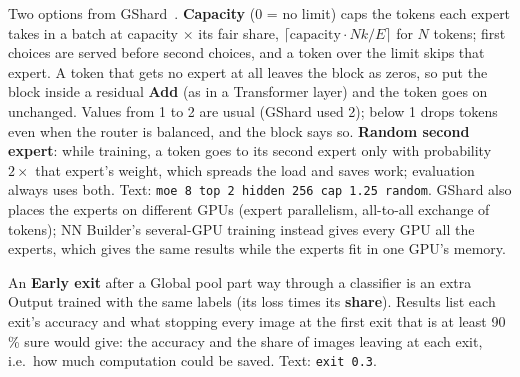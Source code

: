 \documentclass[11pt,a4paper]{article}
\newcommand{\ui}[1]{\textbf{\textsf{#1}}}
\begin{document}
\begin{description}[nosep]
        Two options from GShard~\cite{lepikhin2020gshard}. \ui{Capacity} (0 = no limit) caps the tokens each expert takes in a batch
        at capacity $\times$ its fair share, $\lceil \text{capacity} \cdot N k / E \rceil$ for $N$ tokens; first choices are served
        before second choices, and a token over the limit skips that expert. A token that gets no expert at all leaves the block as
        zeros, so put the block inside a residual \ui{Add} (as in a Transformer layer) and the token goes on unchanged. Values from 1 to 2 are
        usual (GShard used 2); below 1 drops tokens even when the router is balanced, and the block says so. \ui{Random second expert}:
        while training, a token goes to its second expert only with probability $2\times$ that expert's weight, which spreads the load and
        saves work; evaluation always uses both. Text: \texttt{moe 8 top 2 hidden 256 cap 1.25 random}. GShard also places the experts
        on different GPUs (expert parallelism, all-to-all exchange of tokens); NN Builder's several-GPU training instead gives every GPU
        all the experts, which gives the same results while the experts fit in one GPU's memory.
  \item[Early exits.] An \ui{Early exit} after a Global pool part way through a classifier is an extra Output trained with the same labels
        (its loss times its \ui{share}). Results list each exit's accuracy and what stopping every image at the first exit that is at
        least 90\,\% sure would give: the accuracy and the share of images leaving at each exit, i.e.\ how much computation could be
        saved. Text: \texttt{exit 0.3}.
\end{description}
\end{document}
